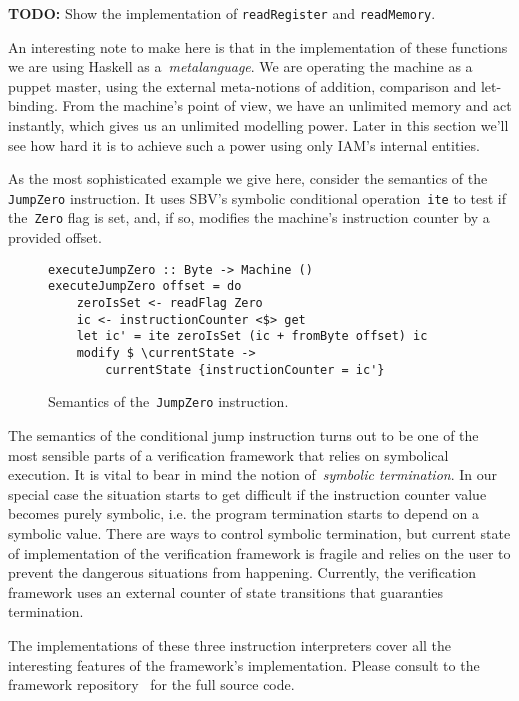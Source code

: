 \textbf{TODO:} Show the implementation of \texttt{readRegister}
and \texttt{readMemory}.

An interesting note to make here is that in the implementation of these functions
we are using Haskell as a~\emph{metalanguage}. We are operating the machine as
a puppet master, using the external meta-notions of addition, comparison and let-binding.
From the machine's point of view, we have an unlimited memory and act instantly,
which gives us an unlimited modelling power. Later in this section we'll see how
hard it is to achieve such a power using only IAM's internal entities.

As the most sophisticated example we give here, consider the semantics of the
\texttt{JumpZero} instruction. It uses SBV's symbolic conditional
operation~\texttt{ite} to test if the~\texttt{Zero} flag
is set, and, if so, modifies the machine's instruction counter by a provided offset.

\begin{figure}[H]
\begin{verbatim}
executeJumpZero :: Byte -> Machine ()
executeJumpZero offset = do
    zeroIsSet <- readFlag Zero
    ic <- instructionCounter <$> get
    let ic' = ite zeroIsSet (ic + fromByte offset) ic
    modify $ \currentState ->
        currentState {instructionCounter = ic'}
\end{verbatim}
\caption{Semantics of the~\texttt{JumpZero} instruction.}
\label{jumpZeroSemantics}
\end{figure}

The semantics of the conditional jump instruction turns out to be one of the
most sensible parts of a verification framework that relies on symbolical execution.
It is vital to bear in mind the notion of~\emph{symbolic termination}. In our special
case the situation starts to get difficult if the instruction counter value becomes
purely symbolic, i.e. the program termination starts to depend on a symbolic value.
There are ways to control symbolic termination, but current state of implementation of
the verification framework is fragile and relies on the user to prevent the dangerous
situations from happening. Currently, the verification framework uses an external
counter of state transitions that guaranties termination.

The implementations of these three instruction interpreters cover all the interesting
features of the framework's implementation. Please consult to the framework
repository~\cite{IAMGithub} for the full source code.